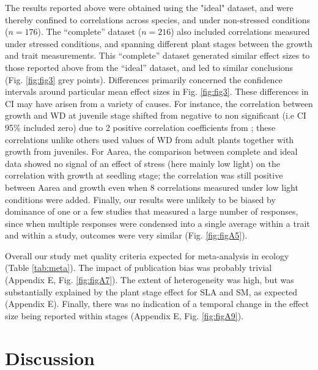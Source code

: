 \documentclass[a4paper,11pt]{article}
\begin{document}
The results reported above were obtained using the "ideal" dataset, and were thereby confined to correlations across species, and under non-stressed conditions ($n = 176$). The ``complete'' dataset ($n = 216$) also included correlations measured under stressed conditions, and spanning different plant stages between the growth and trait measurements. This ``complete'' dataset generated similar effect sizes to those reported above from the ``ideal'' dataset, and led to similar conclusions (Fig. \ref{fig:fig3} grey points). Differences primarily concerned the confidence intervals around particular mean effect sizes in Fig. \ref{fig:fig3}. These differences in CI may have arisen from a variety of causes. For instance, the correlation between growth and WD at juvenile stage shifted from negative to non significant (i.e CI 95\% included zero) due to 2 positive correlation coefficients from \citet{Augspurger:1984ct}; these correlations unlike others used values of WD from adult plants together with growth from juveniles. For Aarea, the comparison between complete and ideal data showed no signal of an effect of stress (here mainly low light) on the correlation with growth at seedling stage; the correlation was still positive between Aarea and growth even when 8 correlations measured under low light conditions were added. Finally, our results were unlikely to be biased by dominance of one or a few studies that measured a large number of responses, since when multiple responses were condensed into a single average within a trait and within a study, outcomes were very similar (Fig. \ref{fig:figA5}).

Overall our study met quality criteria expected for meta-analysis in ecology (Table \ref{tab:meta}). The impact of publication bias was probably trivial (Appendix E, Fig. \ref{fig:figA7}). The extent of heterogeneity was high, but was substantially explained by the plant stage effect for SLA and SM, as expected (Appendix E). Finally, there was no indication of a temporal change in the effect size being reported within stages (Appendix E, Fig. \ref{fig:figA9}).


\section*{Discussion}\label{discussion}
\end{document}
